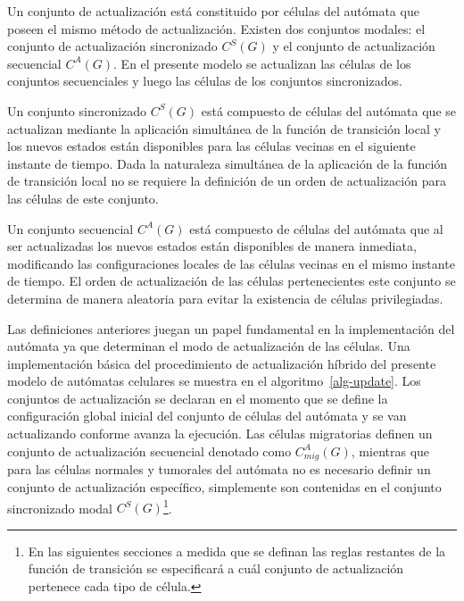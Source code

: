 \begin{definition}
\label{modal}
Un conjunto de actualizaci\'on est\'a constituido por c\'elulas del aut\'omata que poseen el mismo m\'etodo de actualizaci\'on. Existen dos conjuntos modales: el conjunto de actualizaci\'on sincronizado $C^S(G)$ y el conjunto de actualizaci\'on secuencial $C^A(G)$. En el presente modelo se actualizan las c\'elulas de los conjuntos secuenciales y luego las c\'elulas de los conjuntos sincronizados.
\end{definition}

\begin{definition}
\label{sync-modal}
Un conjunto sincronizado $C^S(G)$ est\'a compuesto de c\'elulas del aut\'omata que se actualizan mediante la aplicaci\'on simult\'anea de la funci\'on de transici\'on local y los nuevos estados est\'an disponibles para las c\'elulas vecinas en el siguiente instante de tiempo. Dada la naturaleza simult\'anea de la aplicaci\'on de la funci\'on de transici\'on local no se requiere la definici\'on de un orden de actualizaci\'on para las c\'elulas de este conjunto.
\end{definition}

\begin{definition}
\label{async-modal}
Un conjunto secuencial $C^A(G)$ est\'a compuesto de c\'elulas del aut\'omata que al ser actualizadas los nuevos estados est\'an disponibles de manera inmediata, modificando las configuraciones locales de las c\'elulas vecinas en el mismo instante de tiempo. El orden de actualizaci\'on de las c\'elulas pertenecientes este conjunto se determina de manera aleatoria para evitar la existencia de c\'elulas privilegiadas.  
\end{definition}

Las definiciones anteriores juegan un papel fundamental en la implementaci\'on del aut\'omata ya que determinan el modo de actualizaci\'on de las c\'elulas. Una implementaci\'on b\'asica del procedimiento de actualizaci\'on h\'ibrido del presente modelo de aut\'omatas celulares se muestra en el algoritmo~\ref{alg-update}. Los conjuntos de actualizaci\'on se declaran en el momento que se define la configuraci\'on global inicial del conjunto de c\'elulas del aut\'omata y se van actualizando conforme avanza la ejecuci\'on. Las c\'elulas migratorias definen un conjunto de actualizaci\'on secuencial denotado como $C_{mig}^A(G)$, mientras que para las c\'elulas normales y tumorales del aut\'omata no es necesario definir un conjunto de actualizaci\'on espec\'ifico, simplemente son contenidas en el conjunto sincronizado modal $C^S(G)$\footnote{En las siguientes secciones a medida que se definan las reglas restantes de la funci\'on de transici\'on se especificar\'a a cu\'al conjunto de actualizaci\'on pertenece cada tipo de c\'elula.}. 


